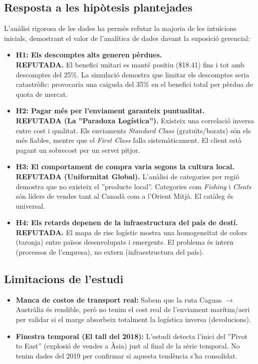 \documentclass[12pt,a4paper]{article}
\begin{document}
\subsection{Resposta a les hipòtesis plantejades}
L'anàlisi rigorosa de les dades ha permès refutar la majoria de les intuïcions inicials, demostrant el valor de l'analítica de dades davant la suposició gerencial:

\begin{itemize}
    \item \textbf{H1: Els descomptes alts generen pèrdues.} \\
    \textbf{REFUTADA.} El benefici unitari es manté positiu (\$18.41) fins i tot amb descomptes del 25\%. La simulació demostra que limitar els descomptes seria catastròfic: provocaria una caiguda del 35\% en el benefici total per pèrdua de quota de mercat.
    
    \item \textbf{H2: Pagar més per l'enviament garanteix puntualitat.} \\
    \textbf{REFUTADA (La ''Paradoxa Logística'').} Existeix una correlació inversa entre cost i qualitat. Els enviaments \textit{Standard Class} (gratuïts/barats) són els més fiables, mentre que el \textit{First Class} falla sistemàticament. El client està pagant un sobrecost per un servei pitjor.
    
    \item \textbf{H3: El comportament de compra varia segons la cultura local.} \\
    \textbf{REFUTADA (Uniformitat Global).} L'anàlisi de categories per regió demostra que no existeix el ''producte local''. Categories com \textit{Fishing} i \textit{Cleats} són líders de vendes tant al Canadà com a l'Orient Mitjà. El catàleg és universal.
    
    \item \textbf{H4: Els retards depenen de la infraestructura del país de destí.} \\
    \textbf{REFUTADA.} El mapa de risc logístic mostra una homogeneïtat de colors (taronja) entre països desenvolupats i emergents. El problema és intern (processos de l'empresa), no extern (infraestructura del país).
\end{itemize}

\subsection{Limitacions de l'estudi}
\begin{itemize}
    \item \textbf{Manca de costos de transport real:} Sabem que la ruta Caguas $\rightarrow$ Austràlia és rendible, però no tenim el cost real de l'enviament marítim/aeri per validar si el marge absorbeix totalment la logística inversa (devolucions).
    \item \textbf{Finestra temporal (El tall del 2018):} L'estudi detecta l'inici del ''Pivot to East'' (explosió de vendes a Àsia) just al final de la sèrie temporal. No tenim dades del 2019 per confirmar si aquesta tendència s'ha consolidat.
\end{itemize}
\end{document}

